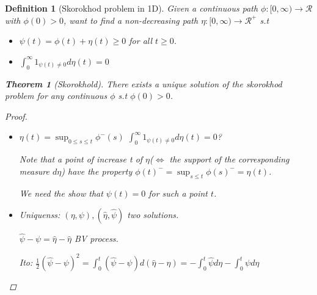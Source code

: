 \documentclass{article} \usepackage[utf8]{inputenc}
\newtheorem{theorem}{Theorem}
\newtheorem{definition}{Definition}
\begin{document}
  \begin{definition}[Skorokhod problem in 1D]
    Given a continuous path $\phi: [0, \infty) \rightarrow \mathcal{R}$ with $\phi(0) > 0$, want to find a non-decreasing path
    $\eta: [0, \infty)\rightarrow \mathcal{R}^+$ s.t
    \begin{itemize}
    \item $\psi(t) = \phi(t) + \eta(t) \ge 0$ for all $t \ge 0$.
    \item $\int_0^{\infty} 1_{\psi(t) \ne 0} d\eta(t)= 0$
    \end{itemize}

    \begin{theorem}[Skorokhold]
      There exists a unique solution of the skorokhod problem for any continuous $\phi$ s.t $\phi(0) > 0$.
    \end{theorem}
    \begin{proof}
      \begin{itemize}
      \item $\eta(t) = \sup_{0 \le s \le t} \phi^-(s)$
        $\int_0^{\infty} 1_{\psi(t) \ne 0} d\eta(t) = 0$?

        Note that a point of increase t of $\eta$($\iff$ the support of the corresponding measure $d\eta$) have the property
        $\phi(t)^- = \sup_{s \le t} \phi(s)^- = \eta(t)$.
        
        We need the show that $\psi(t) = 0$ for such a point $t$.
        
      \item Uniquenss: $(\eta, \psi), (\hat \eta, \hat \psi)$ two solutions.
        
        $\hat \psi - \psi = \hat \eta - \hat \eta$ BV process.

        Ito: $\frac12 (\hat \psi - \psi)^2 = \int_0^t (\hat \psi - \psi)d(\hat \eta - \eta) =
        - \int_0^t \hat \psi d\eta - \int_0^t  \psi d \hat \eta$
      \end{itemize}
    \end{proof}
  \end{definition}
\end{document}
